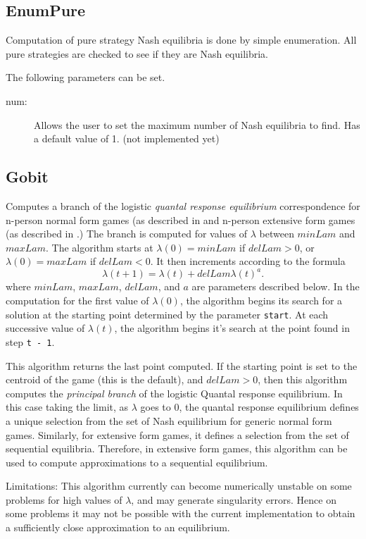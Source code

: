 \subsection{EnumPure}\label{EnumPure}
Computation of pure strategy Nash equilibria is done by simple enumeration.
All pure strategies are checked to see if they are Nash equilibria.  

The following parameters can be set. 

\begin{description}
\item[num:] Allows the user to set the maximum number of Nash equilibria to
find.  Has a default value of 1. (not implemented yet) 
\end{description}


\subsection{Gobit}\label{Gobit}
Computes a branch of the logistic {\em quantal response equilibrium} 
correspondence for n-person normal form games (as described 
in \cite{McKPal:95a}  and n-person extensive form games (as described 
in \cite{McKPal:95b}.) The branch is computed 
for values of $\lambda$ between $minLam$ and $maxLam$.  The algorithm 
starts at $\lambda(0) = minLam$ if $delLam > 0$, or 
$\lambda(0) = maxLam$ if 
$delLam < 0$. It then increments according to the formula 
$$
\lambda(t+1) = \lambda(t) +delLam \lambda(t)^a.
$$
where $minLam$, $maxLam$, $delLam$, and $a$ are
parameters described below. In the computation for the first value of
$\lambda(0)$, the algorithm begins its search for a solution at the
starting point determined by the parameter \verb+start+.  At each
successive value of $\lambda(t)$, the algorithm begins it's search at
the point found in step \verb+t - 1+.  

This algorithm returns the last point computed.  
If the starting point is set to the centroid of the game (this is the
default), and $delLam > 0$, then this algorithm computes the {\em principal
branch} of the logistic Quantal response equilibrium.  In this case
taking the limit, as $\lambda$ goes to 0, the quantal response equilibrium
defines a unique selection from the set of Nash equilibrium for generic
normal form games.  Similarly, for extensive form games, it
defines a selection from the set of sequential equilibria.
Therefore, in extensive form games, this algorithm can be used to compute
approximations to a sequential equilibrium.

Limitations:  This algorithm currently can become numerically unstable 
on some problems for high values of $\lambda$, and may generate 
singularity errors.  Hence 
on some problems it may not be possible with the current
implementation to obtain a sufficiently close approximation to an
equilibrium. 

